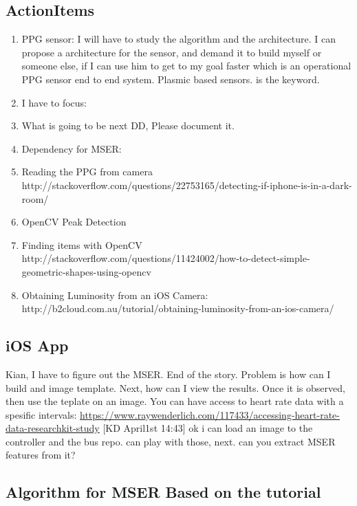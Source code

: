 \documentclass{IEEEtran}
\begin{document}
\subsection{ActionItems}
\begin{enumerate}
\item PPG sensor: I will have to study the algorithm and the architecture. I can propose a architecture for the sensor, and demand it to build myself or someone else, if I can use him to get to my goal faster which is an operational PPG sensor end to end system. Plasmic based sensors.  is the keyword. 
\item I have to focus: 
\item What is going to be next DD, Please document it. 
\item Dependency for MSER: 
\item Reading the PPG from camera
http://stackoverflow.com/questions/22753165/detecting-if-iphone-is-in-a-dark-room/
\item OpenCV Peak Detection
\item Finding items with OpenCV
http://stackoverflow.com/questions/11424002/how-to-detect-simple-geometric-shapes-using-opencv
\item Obtaining Luminosity from an iOS Camera: http://b2cloud.com.au/tutorial/obtaining-luminosity-from-an-ios-camera/
\end{enumerate}

\subsection{iOS App}
Kian, I have to figure out the MSER. End of the story. 
Problem is how can I build and image template. Next, how can I view the results.
Once it is observed, then use the teplate on an image.
You can have access to heart rate data with a spesific intervals: \hyperlink{https://www.raywenderlich.com/117433/accessing-heart-rate-data-researchkit-study}{https://www.raywenderlich.com/117433/accessing-heart-rate-data-researchkit-study}
[KD April1st 14:43] ok i can load an image to the controller and the bus repo. can play with those, next. can you extract MSER features from it? 


\subsection{Algorithm for MSER Based on the tutorial}
\end{document}
